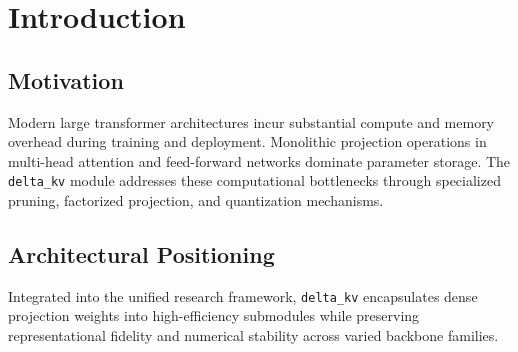 \section{Introduction}

\subsection{Motivation}
Modern large transformer architectures incur substantial compute and memory overhead during training and deployment. Monolithic projection operations in multi-head attention and feed-forward networks dominate parameter storage. The \texttt{delta_kv} module addresses these computational bottlenecks through specialized pruning, factorized projection, and quantization mechanisms.

\subsection{Architectural Positioning}
Integrated into the unified research framework, \texttt{delta_kv} encapsulates dense projection weights into high-efficiency submodules while preserving representational fidelity and numerical stability across varied backbone families.
